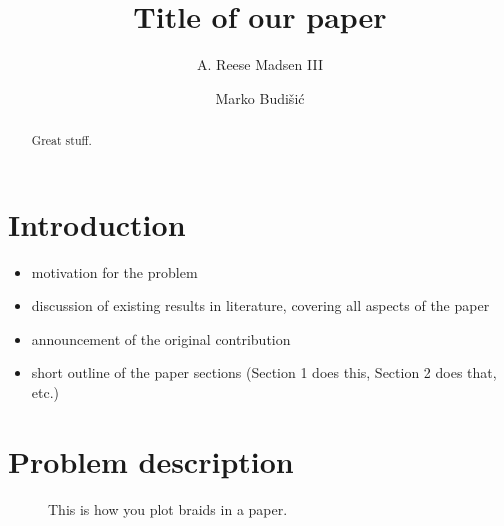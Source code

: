 \documentclass{amsart}
\begin{document}
\title{Title of our paper}

\author{A. Reese Madsen III}
\address{Department of Mathematics, Clarkson University,
Potsdam, NY}

\author{Marko Budi\v{s}i\'c}
\address{Department of Mathematics, Clarkson University,
Potsdam, NY}

\begin{abstract}
Great stuff.
\end{abstract}

\maketitle %
\tableofcontents %

\section{Introduction}

\begin{itemize}
\item motivation for the problem
\item discussion of existing results in literature, covering all aspects of the paper
\item announcement of the original contribution
\item short outline of the paper sections (Section 1 does this, Section 2 does that, etc.)
\end{itemize}

\section{Problem description}

\begin{figure}[htb]
  \centering
  \begin{center}
\end{center}
\caption{This is how you plot braids in a paper.}\label{fig:braids}
\end{figure}
\end{document}
